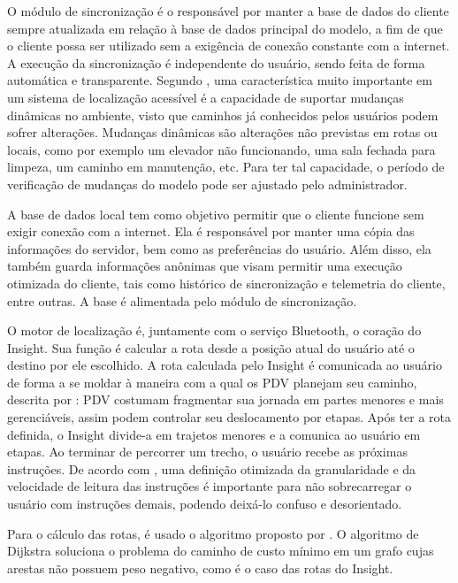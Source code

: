 \documentclass[twoside,english,brazilian]{UNISINOSartigo}
\begin{document}
O módulo de sincronização é o responsável por manter a base de dados do cliente sempre atualizada em relação à base de dados principal do modelo, a fim de que o cliente possa ser utilizado sem a exigência de conexão constante com a internet. A execução da sincronização é independente do usuário, sendo feita de forma automática e transparente. Segundo , uma característica muito importante em um sistema de localização acessível é a capacidade de suportar mudanças dinâmicas no ambiente, visto que caminhos já conhecidos pelos usuários podem sofrer alterações. Mudanças dinâmicas são alterações não previstas em rotas ou locais, como por exemplo um elevador não funcionando, uma sala fechada para limpeza, um caminho em manutenção, etc. Para ter tal capacidade, o período de verificação de mudanças do modelo pode ser ajustado pelo administrador.

A base de dados local tem como objetivo permitir que o cliente funcione sem exigir conexão com a internet. Ela é responsável por manter uma cópia das informações do servidor, bem como as preferências do usuário. Além disso, ela também guarda informações anônimas que visam permitir uma execução otimizada do cliente, tais como histórico de sincronização e telemetria do cliente, entre outras. A base é alimentada pelo módulo de sincronização.

O motor de localização é, juntamente com o serviço Bluetooth, o coração do Insight. Sua função é calcular a rota desde a posição atual do usuário até o destino por ele escolhido. A rota calculada pelo Insight é comunicada ao usuário de forma a se moldar à maneira com a qual os PDV planejam seu caminho, descrita por : PDV costumam fragmentar sua jornada em partes menores e mais gerenciáveis, assim podem controlar seu deslocamento por etapas. Após ter a rota definida, o Insight divide-a em trajetos menores e a comunica ao usuário em etapas. Ao terminar de percorrer um trecho, o usuário recebe as próximas instruções. De acordo com , uma definição otimizada da granularidade e da velocidade de leitura das instruções é importante para não sobrecarregar o usuário com instruções demais, podendo deixá-lo confuso e desorientado. 

Para o cálculo das rotas, é usado o algoritmo proposto por . O algoritmo de Dijkstra soluciona o problema do caminho de custo mínimo em um grafo cujas arestas não possuem peso negativo, como é o caso das rotas do Insight.
\end{document}

